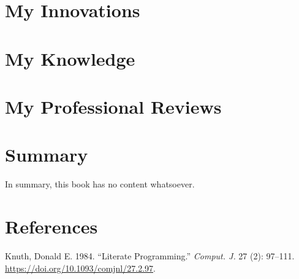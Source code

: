 \documentclass[
  letterpaper,
  DIV=11,
  numbers=noendperiod]{scrreprt}
\newlength{\cslhangindent}
\newenvironment{CSLReferences}[2] %
 {\begin{list}{}{%
  \setlength{\itemindent}{0pt}
  \setlength{\leftmargin}{0pt}
  \setlength{\parsep}{0pt}
  \ifodd #1
   \setlength{\leftmargin}{\cslhangindent}
   \setlength{\itemindent}{-1\cslhangindent}
  \fi
  \setlength{\itemsep}{#2\baselineskip}}}
 {\end{list}}
\begin{document}

\chapter{My Innovations}\label{my-innovations}


\chapter{My Knowledge}\label{my-knowledge}


\chapter{My Professional Reviews}\label{my-professional-reviews}


\chapter{Summary}\label{summary}

In summary, this book has no content whatsoever.


\chapter*{References}\label{references}


\label{refs}
\begin{CSLReferences}{1}{0}
Knuth, Donald E. 1984. {``Literate Programming.''} \emph{Comput. J.} 27
(2): 97--111. \url{https://doi.org/10.1093/comjnl/27.2.97}.

\end{CSLReferences}
\end{document}

